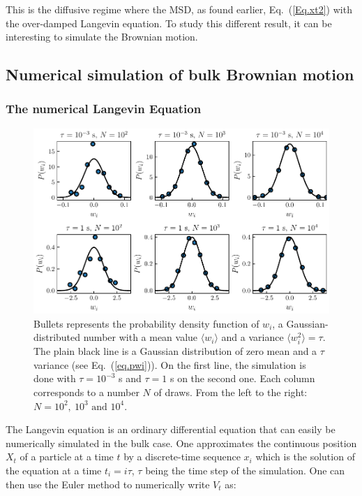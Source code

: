 This is the diffusive regime where the \gls{MSD}, as found earlier, Eq.~(\ref{Eq.xt2}) with the over-damped Langevin equation. To study this different result, it can be interesting to simulate the Brownian motion.

\subsection{Numerical simulation of bulk Brownian motion}

\subsubsection{The numerical Langevin Equation}

\begin{figure}[!hb]
	\centering
	\includegraphics{02_body/chapter1/image/noise_simulation/exemple.pdf}
	\caption{Bullets represents the probability density function of $w_i$, a Gaussian-distributed number with a mean value $\langle w_i \rangle$ and a variance $\langle w_i ^2 \rangle  = \tau$. The plain black line is a Gaussian distribution of zero mean and a $\tau$ variance (see Eq.~(\ref{eq.pwi})). On the first line, the simulation is done with $\tau = 10^{-3}$ s and $\tau = 1$ s on the second one. Each column corresponds to a number $N$ of draws. From the left to the right: $N=10^2, ~10^3 \text{ and } 10^4$.\href{https://github.com/eXpensia/Confined-Brownian-Motion/blob/main/02_body/chapter1/image/noise_simulation/noise_simulation.ipynb}{\faGithub}}
	\label{fig:exempleprecisionwi}
\end{figure}


The Langevin equation is an ordinary differential equation that can easily be numerically simulated in the bulk case. One approximates the continuous position $X_t$ of a particle at a time $t$ by a discrete-time sequence $x_i$ which is the solution of the equation at a time $t_i = i  \tau$, $\tau$ being the time step of the simulation. One can then use the Euler method to numerically write $V_t$ as:


